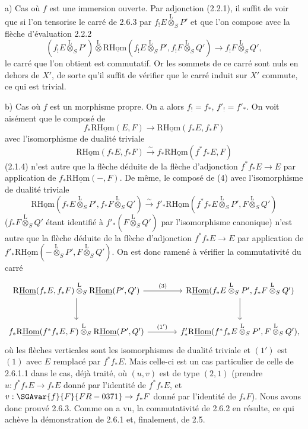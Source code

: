 a) Cas où $f$ est une immersion ouverte. Par adjonction (2.2.1), il suffit de voir que si l'on tensorise le carré de 2.6.3 par $f_!E\overset{\mathrm{L}}{\otimes}_SP'$ et que l'on compose avec la flèche d'évaluation 2.2.2
\[
(f_!E\overset{\mathrm{L}}{\otimes}_SP')\overset{\mathrm{L}}{\otimes}\mathrm{R}\underline{\mathrm{Hom}}(f_!E\overset{\mathrm{L}}{\otimes}_SP',f_!F\overset{\mathrm{L}}{\otimes}_SQ')\longrightarrow f_!F\overset{\mathrm{L}}{\otimes}_SQ',
\]
le carré que l'on obtient est commutatif. Or les sommets de ce carré sont nuls en
dehors de $X'$, de sorte qu'il suffit de vérifier que le carré induit sur $X'$ commute, ce qui est trivial.

b) Cas où $f$ est un morphisme propre. On a alors $f_!=f_*$, $f'_!=f'_*$. On voit aisément que le composé de
\[
f_*\mathrm{R}\underline{\mathrm{Hom}}(E,F)\longrightarrow\mathrm{R}\underline{\mathrm{Hom}}(f_*E,f_*F)
\]
avec l'isomorphisme de dualité triviale
\[
\mathrm{R}\underline{\mathrm{Hom}}(f_*E,f_*F)\xrightarrow{\sim}f_*\mathrm{R}\underline{\mathrm{Hom}}(f^{*}f_*E,F)
\]
(2.1.4) n'est autre que la flèche déduite de la flèche d'adjonction $f^{*}f_*E\to E$ par application de $f_*\mathrm{R}\underline{\mathrm{Hom}}(-,F)$. De même, le composé de (4) avec l'isomorphisme de dualité triviale
\[
\mathrm{R}\underline{\mathrm{Hom}}(f_*E\overset{\mathrm{L}}{\otimes}_SP',f_*F\overset{\mathrm{L}}{\otimes}_SQ')\xrightarrow{\sim}f'_*\mathrm{R}\underline{\mathrm{Hom}}(f^{*}f_*E\overset{\mathrm{L}}{\otimes}_SP',F\overset{\mathrm{L}}{\otimes}_SQ')
\]
($f_*F\overset{\mathrm{L}}{\otimes}_SQ'$ étant identifié à $f'_*(F\overset{\mathrm{L}}{\otimes}_SQ')$ par l'isomorphisme canonique) n'est autre que la flèche déduite de la flèche d'adjonction $f^{*}f_*E\to E$ par application de $f'_*\mathrm{R}\underline{\mathrm{Hom}}(-\overset{\mathrm{L}}{\otimes}_SP',F\overset{\mathrm{L}}{\otimes}_SQ')$. On est donc ramené à vérifier la commutativité du carré
\[
\begin{tikzcd}[column sep=large,row sep=large]
\mathrm{R}\underline{\mathrm{Hom}}(f_*E,f_*F)\overset{\mathrm{L}}{\otimes}_S\mathrm{R}\underline{\mathrm{Hom}}(P',Q') \arrow[r,"(3)"] \arrow[d] & \mathrm{R}\underline{\mathrm{Hom}}(f_*E\overset{\mathrm{L}}{\otimes}_SP',f_*F\overset{\mathrm{L}}{\otimes}_SQ') \arrow[d]\\
f_*\mathrm{R}\underline{\mathrm{Hom}}(f^{*}f_*E,F)\overset{\mathrm{L}}{\otimes}_S\mathrm{R}\underline{\mathrm{Hom}}(P',Q') \arrow[r,"(1')"] & f'_*\mathrm{R}\underline{\mathrm{Hom}}(f^{*}f_*E\overset{\mathrm{L}}{\otimes}_SP',F\overset{\mathrm{L}}{\otimes}_SQ'),
\end{tikzcd}
\]
où les flèches verticales sont les isomorphismes de dualité triviale et $(1')$ est $(1)$ avec $E$ remplacé par $f^{*}f_*E$. Mais celle-ci est un cas particulier de celle de 2.6.1.1 dans le cas, déjà traité, où $(u,v)$ est de type $(2,1)$ (prendre $u:f^{*}f_*E\to f_*E$ donné par l'identité de $f^{*}f_*E$, et $v:\SGAvar{f}{F}{FR-0371}\to f_*F$ donné par l'identité de $f_*F$). Nous avons donc prouvé 2.6.3. Comme on a vu, la commutativité de 2.6.2 en résulte, ce qui achève la démonstration de 2.6.1 et, finalement, de 2.5.

